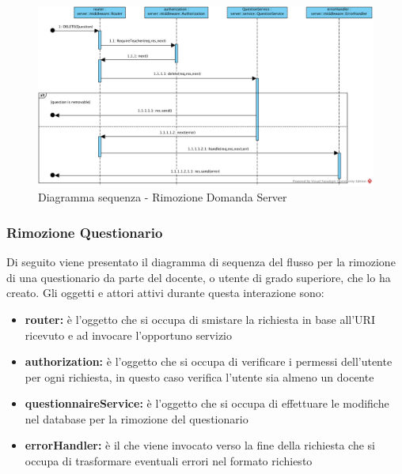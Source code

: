 \documentclass[12pt,a4paper]{article}
\begin{document}
\begin{center}
	\begin{figure}[H]
		\centering \includegraphics[max width=\myheight, angle=90]{../img/diagrammiSequenza/rimozioneDomandaServer.png}
		\caption{Diagramma sequenza - Rimozione Domanda Server}
	\end{figure}
\end{center}

\newpage
\subsubsection{Rimozione Questionario}
Di seguito viene presentato il diagramma di sequenza del flusso per la rimozione di una questionario da parte del docente, o utente di grado superiore, che lo ha creato. Gli oggetti e attori attivi durante questa interazione sono:

\begin{itemize}
	\item \textbf{router:} è l'oggetto che si occupa di smistare la richiesta in base all’URI ricevuto e ad invocare l’opportuno servizio
	\item \textbf{authorization:} è l'oggetto che si occupa di verificare i permessi dell'utente per ogni richiesta, in questo caso verifica l'utente sia almeno un docente
	\item \textbf{questionnaireService:} è l'oggetto che si occupa di effettuare le modifiche nel database per la rimozione del questionario
	\item \textbf{errorHandler:} è il  che viene invocato verso la fine della richiesta che si occupa di trasformare eventuali errori nel formato  richiesto
\end{itemize}
\end{document}
